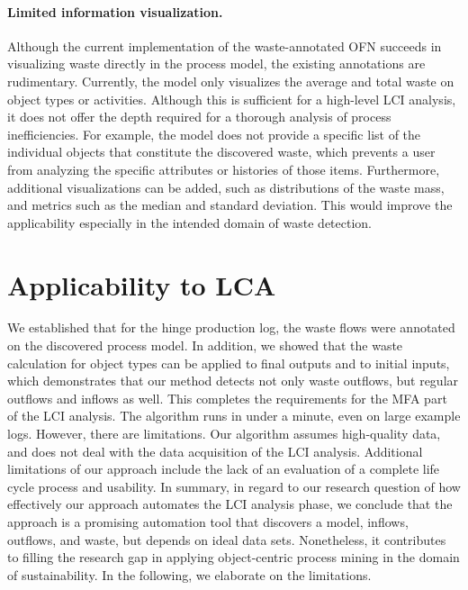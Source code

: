 \paragraph{Limited information visualization.}
Although the current implementation of the waste-annotated OFN succeeds in visualizing waste directly in the process model, the existing annotations are rudimentary.
Currently, the model only visualizes the average and total waste on object types or activities.
Although this is sufficient for a high-level LCI analysis, it does not offer the depth required for a thorough analysis of process inefficiencies.
For example, the model does not provide a specific list of the individual objects that constitute the discovered waste, which prevents a user from analyzing the specific attributes or histories of those items.
Furthermore, additional visualizations can be added, such as distributions of the waste mass, and metrics such as the median and standard deviation.
This would improve the applicability especially in the intended domain of waste detection.



\section{Applicability to LCA}




We established that for the hinge production log, the waste flows were annotated on the discovered process model.
In addition, we showed that the waste calculation for object types can be applied to final outputs and to initial inputs, which demonstrates that our method detects not only waste outflows, but regular outflows and inflows as well.
This completes the requirements for the MFA part of the LCI analysis.
The algorithm runs in under a minute, even on large example logs.
However, there are limitations.
Our algorithm assumes high-quality data, and does not deal with the data acquisition of the LCI analysis.
Additional limitations of our approach include the lack of an evaluation of a complete life cycle process and usability.
In summary, in regard to our research question of how effectively our approach automates the LCI analysis phase, we conclude that the approach is a promising automation tool that discovers a model, inflows, outflows, and waste, but depends on ideal data sets.
Nonetheless, it contributes to filling the research gap in applying object-centric process mining in the domain of sustainability.
In the following, we elaborate on the limitations.






